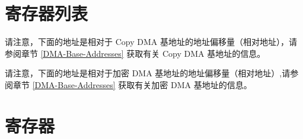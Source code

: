 \documentclass[main\_\_CN.tex]{subfiles}
\begin{document}
\hypertarget{dma-reg-summ}{}
\section{寄存器列表}


请注意，下面的地址是相对于 Copy DMA 基地址的地址偏移量（相对地址），请参阅章节 \ref{DMA-Base-Addresses} 获取有关 Copy DMA 基地址的信息。



请注意，下面的地址是相对于加密 DMA 基地址的地址偏移量（相对地址）,请参阅章节 \ref{DMA-Base-Addresses} 获取有关加密 DMA 基地址的信息。



\section{寄存器}


\end{document}
